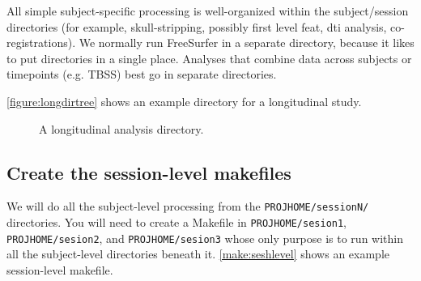 All simple subject-specific processing is well-organized within the subject/session directories (for example, skull-stripping, possibly first level feat, dti analysis, co-registrations). We normally run FreeSurfer in a separate directory, because it likes to put directories in a single place. Analyses that combine data across subjects or timepoints (e.g. TBSS) best go in separate directories.

\autoref{figure:longdirtree} shows an example directory for a longitudinal study.

\begin{center}
	\begin{figure}
	\caption{A longitudinal analysis directory.}
	\end{figure}
	\label{figure:longdirtree}
\end{center}

\subsection{Create the session-level makefiles}
We will do all the subject-level processing from the \texttt{PROJHOME/sessionN/} directories. You will need to create a Makefile in \texttt{PROJHOME/sesion1}, \texttt{PROJHOME/sesion2}, and \texttt{PROJHOME/sesion3} whose only purpose is to run \maken{} within all the subject-level directories beneath it. 
\autoref{make:seshlevel} shows an example session-level makefile.


